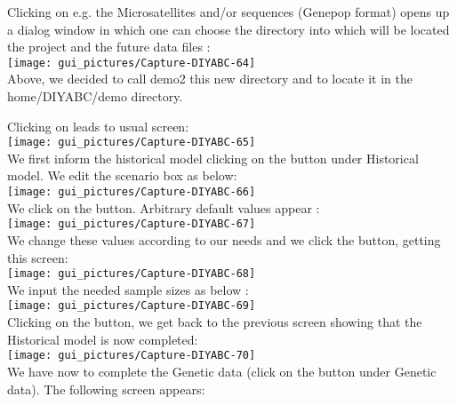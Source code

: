 Clicking on e.g. the \textsf{Microsatellites and/or sequences (Genepop
format)} opens up a dialog window in which one can choose the directory
into which will be located the project and the future data files :\\


\texttt{[image: gui\_pictures/Capture-DIYABC-64]} \\


Above, we decided to call \textsf{demo2} this new directory and to
locate it in the \textsf{home/DIYABC/demo} directory.

Clicking on  leads to usual screen:\\


\texttt{[image: gui\_pictures/Capture-DIYABC-65]} \\


We first inform the historical model clicking on the 
button under \textsf{Historical model}. We edit the scenario box as
below:\\


\texttt{[image: gui\_pictures/Capture-DIYABC-66]} \\


We click on the  button. Arbitrary
default values appear :\\


\texttt{[image: gui\_pictures/Capture-DIYABC-67]} \\


We change these values according to our needs and we click the  button, getting this screen:\\


\texttt{[image: gui\_pictures/Capture-DIYABC-68]} \\


We input the needed sample sizes as below :\\


\texttt{[image: gui\_pictures/Capture-DIYABC-69]} \\


Clicking on the  button, we get back to
the previous screen showing that the Historical model is now completed:\\


\texttt{[image: gui\_pictures/Capture-DIYABC-70]} \\


We have now to complete the Genetic data (click on the 
button under \textsf{Genetic data}). The following screen appears:\\


